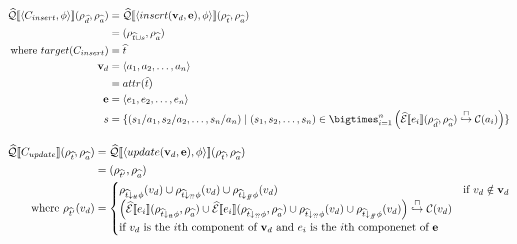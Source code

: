 \begin{align}
    \abssqlsem{\langle C_{insert}, \phi \rangle}(\rho_{\ab{d}}, \rho_{\ab{a}}) & =
    \abssqlsem{\langle insert(\mathbf{v}_d, \mathbf{e}), \phi \rangle}(\rho_{\ab{t}}, \rho_{\ab{a}})\\
    & = (\rho_{\ab{t} \cup s}, \rho_{\ab{a}}) \\
    \text{where } target(C_{insert})        & = \ab{t}                                                                                                                                                 \\
    \mathbf{v}_d              & = \langle a_1, a_2, \dots, a_n \rangle                                                                                                        \\
                                               & = attr(\ab{t})                                                                                                                                           \\
    \mathbf{e} & = \langle e_1, e_2, \dots, e_n \rangle \\
    s &= \{ (s_1/a_1, s_2/a_2, \dots, s_n/a_n) \mid (s_1, s_2, \dots, s_n) \in \bigtimes_{i = 1}^{n} \left( \absexpsem{e_i}(\rho_{\ab{d}}, \rho_{\ab{a}}) \into \lookupcl(a_i) \right) \}
\end{align}


\begin{align}
    \abssqlsem{C_{update}}(\env{\abstable}, \env{\absvars})
                                              & = \abssqlsem{\langle update(\absattrs, \absexps), \abspred \rangle} (\env{\abstable}, \env{\absvars}) \\
                                              & = (\env{\abstable'}, \env{\absvars})                                                                 \\
    \text{where } \env{\abstable'}(\absattr) & =
    \begin{cases}
        \env{\abstable \downarrow_{\true} \abspred}(\absattr) \cup \env{\abstable \downarrow_{\unknown} \abspred}(\absattr) \cup \env{\abstable \downarrow_{\false} \abspred}(\absattr) & \text{if } \absattr \notin \absattrs \\
        \left( \absexpsem{\absexp{i}}(\env{\abstable \downarrow_{\true} \abspred}, \env{\absvars}) \cup
        \absexpsem{\absexp{i}}(\env{\abstable \downarrow_{\unknown} \abspred}, \env{\absvars}) \cup \env{\abstable \downarrow_{\unknown} \abspred}(\absattr) \cup \env{\abstable \downarrow_{\false} \abspred}(\absattr) \right) \into \lookupcl(v_{d})\\
        \text{if $\absattr$ is the $i$th component of $\absattrs$ and $\absexp{i}$ is the $i$th componenet of $\absexps$} \\
    \end{cases}
\end{align}

